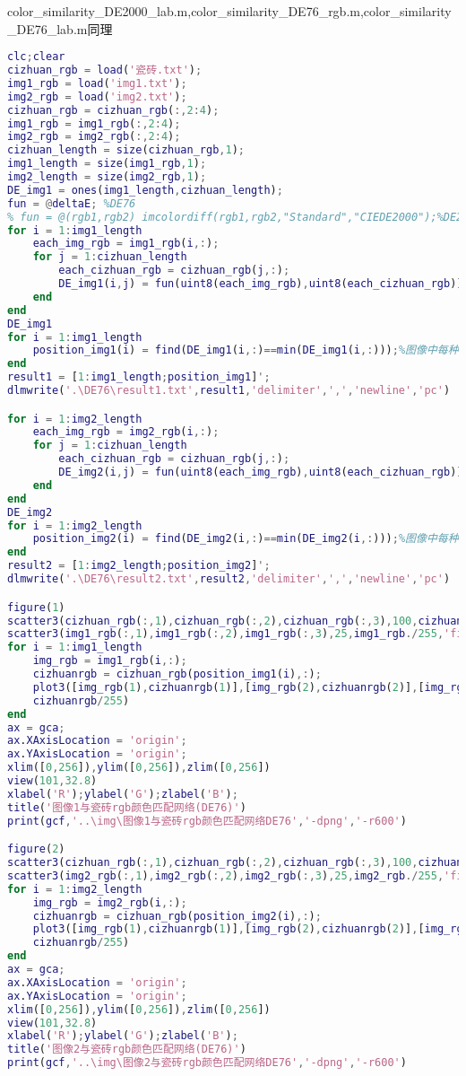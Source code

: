 color\_similarity\_DE2000\_lab.m,color\_similarity\_DE76\_rgb.m,color\_similarity\_DE76\_lab.m同理
\begin{lstlisting}[language=matlab]
clc;clear
cizhuan_rgb = load('瓷砖.txt');
img1_rgb = load('img1.txt');
img2_rgb = load('img2.txt');
cizhuan_rgb = cizhuan_rgb(:,2:4);
img1_rgb = img1_rgb(:,2:4);
img2_rgb = img2_rgb(:,2:4);
cizhuan_length = size(cizhuan_rgb,1);
img1_length = size(img1_rgb,1);
img2_length = size(img2_rgb,1);
DE_img1 = ones(img1_length,cizhuan_length);
fun = @deltaE; %DE76
% fun = @(rgb1,rgb2) imcolordiff(rgb1,rgb2,"Standard","CIEDE2000");%DE2000
for i = 1:img1_length
	each_img_rgb = img1_rgb(i,:);
	for j = 1:cizhuan_length
		each_cizhuan_rgb = cizhuan_rgb(j,:);
		DE_img1(i,j) = fun(uint8(each_img_rgb),uint8(each_cizhuan_rgb));%计算相似度
	end
end
DE_img1
for i = 1:img1_length
	position_img1(i) = find(DE_img1(i,:)==min(DE_img1(i,:)));%图像中每种rgb对应瓷砖的rgb的编号
end
result1 = [1:img1_length;position_img1]';
dlmwrite('.\DE76\result1.txt',result1,'delimiter',',','newline','pc')

for i = 1:img2_length
	each_img_rgb = img2_rgb(i,:);
	for j = 1:cizhuan_length
		each_cizhuan_rgb = cizhuan_rgb(j,:);
		DE_img2(i,j) = fun(uint8(each_img_rgb),uint8(each_cizhuan_rgb));%计算相似度
	end
end
DE_img2
for i = 1:img2_length
	position_img2(i) = find(DE_img2(i,:)==min(DE_img2(i,:)));%图像中每种rgb对应瓷砖的rgb的编号
end
result2 = [1:img2_length;position_img2]';
dlmwrite('.\DE76\result2.txt',result2,'delimiter',',','newline','pc')

figure(1)
scatter3(cizhuan_rgb(:,1),cizhuan_rgb(:,2),cizhuan_rgb(:,3),100,cizhuan_rgb./255,'filled');hold on
scatter3(img1_rgb(:,1),img1_rgb(:,2),img1_rgb(:,3),25,img1_rgb./255,'filled');hold on 
for i = 1:img1_length
	img_rgb = img1_rgb(i,:);
	cizhuanrgb = cizhuan_rgb(position_img1(i),:);
	plot3([img_rgb(1),cizhuanrgb(1)],[img_rgb(2),cizhuanrgb(2)],[img_rgb(3),cizhuanrgb(3)],'color',...
	cizhuanrgb/255)
end
ax = gca;
ax.XAxisLocation = 'origin';
ax.YAxisLocation = 'origin';
xlim([0,256]),ylim([0,256]),zlim([0,256])
view(101,32.8)
xlabel('R');ylabel('G');zlabel('B');
title('图像1与瓷砖rgb颜色匹配网络(DE76)')
print(gcf,'..\img\图像1与瓷砖rgb颜色匹配网络DE76','-dpng','-r600')

figure(2)
scatter3(cizhuan_rgb(:,1),cizhuan_rgb(:,2),cizhuan_rgb(:,3),100,cizhuan_rgb./255,'filled');hold on
scatter3(img2_rgb(:,1),img2_rgb(:,2),img2_rgb(:,3),25,img2_rgb./255,'filled');hold on 
for i = 1:img2_length
	img_rgb = img2_rgb(i,:);
	cizhuanrgb = cizhuan_rgb(position_img2(i),:);
	plot3([img_rgb(1),cizhuanrgb(1)],[img_rgb(2),cizhuanrgb(2)],[img_rgb(3),cizhuanrgb(3)],'color',...
	cizhuanrgb/255)
end
ax = gca;
ax.XAxisLocation = 'origin';
ax.YAxisLocation = 'origin';
xlim([0,256]),ylim([0,256]),zlim([0,256])
view(101,32.8)
xlabel('R');ylabel('G');zlabel('B');
title('图像2与瓷砖rgb颜色匹配网络(DE76)')
print(gcf,'..\img\图像2与瓷砖rgb颜色匹配网络DE76','-dpng','-r600')
\end{lstlisting}

